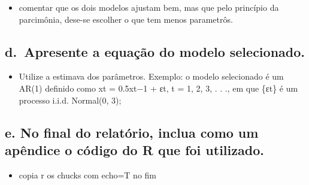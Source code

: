 \documentclass[
  letterpaper,
  DIV=11,
  numbers=noendperiod]{scrartcl}
\providecommand{\tightlist}{%
  \setlength{\itemsep}{0pt}\setlength{\parskip}{0pt}}\usepackage{longtable,booktabs,array}
\begin{document}
\begin{itemize}
\tightlist
\item
  comentar que os dois modelos ajustam bem, mas que pelo princípio da
  parcimônia, dese-se escolher o que tem menos parametrôs.
\end{itemize}

\hypertarget{d.-apresente-a-equauxe7uxe3o-do-modelo-selecionado.}{%
\subsection{d.~Apresente a equação do modelo
selecionado.}\label{d.-apresente-a-equauxe7uxe3o-do-modelo-selecionado.}}

\begin{itemize}
\tightlist
\item
  Utilize a estimava dos parâmetros. Exemplo: o modelo selecionado é um
  AR(1) definido como xt = 0.5xt−1 + εt, t = 1, 2, 3, . . ., em que
  \{εt\} é um processo i.i.d. Normal(0, 3);
\end{itemize}

\hypertarget{e.-no-final-do-relatuxf3rio-inclua-como-um-apuxeandice-o-cuxf3digo-do-r-que-foi-utilizado.}{%
\subsection{e. No final do relatório, inclua como um apêndice o código
do R que foi
utilizado.}\label{e.-no-final-do-relatuxf3rio-inclua-como-um-apuxeandice-o-cuxf3digo-do-r-que-foi-utilizado.}}

\begin{itemize}
\tightlist
\item
  copia r os chucks com echo=T no fim
\end{itemize}
\end{document}
